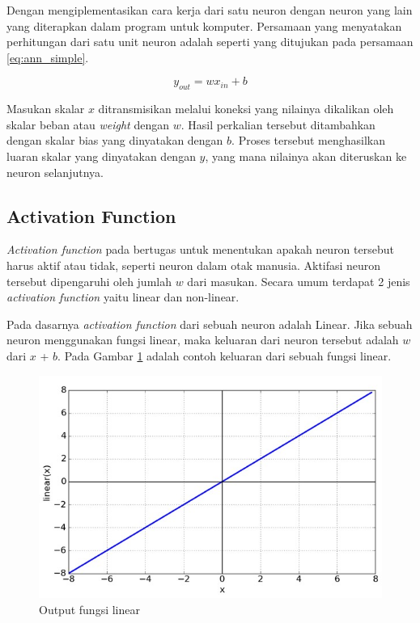 Dengan mengiplementasikan cara kerja dari satu neuron dengan neuron yang lain yang diterapkan dalam program untuk komputer. Persamaan yang menyatakan perhitungan dari satu unit neuron adalah seperti yang ditujukan pada persamaan \ref{eq:ann_simple}.
\vspace{1ex}

\begin{equation}\label{eq:ann_simple}
y_{out} = wx_{in} + b
\end{equation}

Masukan skalar $x$ ditransmisikan melalui koneksi yang nilainya dikalikan oleh skalar beban atau \textit{weight} dengan $w$. Hasil perkalian tersebut ditambahkan dengan skalar bias yang dinyatakan dengan $b$. Proses tersebut menghasilkan luaran skalar yang dinyatakan dengan $y$, yang mana nilainya akan diteruskan ke neuron selanjutnya.
\vspace{1ex}

\subsection{Activation Function}
\label{sec:sub_sec2_activation_func}

\textit{Activation function} pada bertugas untuk menentukan apakah neuron tersebut harus aktif atau tidak, seperti neuron dalam otak manusia. Aktifasi neuron tersebut dipengaruhi oleh jumlah $w$ dari masukan. Secara umum terdapat 2 jenis \textit{activation function} yaitu linear dan non-linear.
\vspace{1ex}

Pada dasarnya \textit{activation function} dari sebuah neuron adalah Linear. Jika sebuah neuron menggunakan fungsi linear, maka keluaran dari neuron tersebut adalah $w$ dari $x$ + $b$. Pada Gambar \ref{fig:ann_linear} adalah contoh keluaran dari sebuah fungsi linear.
\vspace{1ex}

\begin{figure} [!h] \centering
	\includegraphics[scale=0.35]{img/ann_linear.jpeg}
	\caption{Output fungsi linear}
	\label{fig:ann_linear}
\end{figure}

